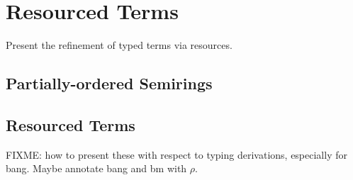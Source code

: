 \documentclass[sigplan,review]{acmart}\settopmatter{printfolios=true,printccs=false,printacmref=false}
\begin{document}
\section{Resourced Terms}

Present the refinement of typed terms via resources.

\subsection{Partially-ordered Semirings}

\subsection{Resourced Terms}

FIXME: how to present these with respect to typing derivations, especially for
bang. Maybe annotate bang and bm with $\rho$.
\end{document}
